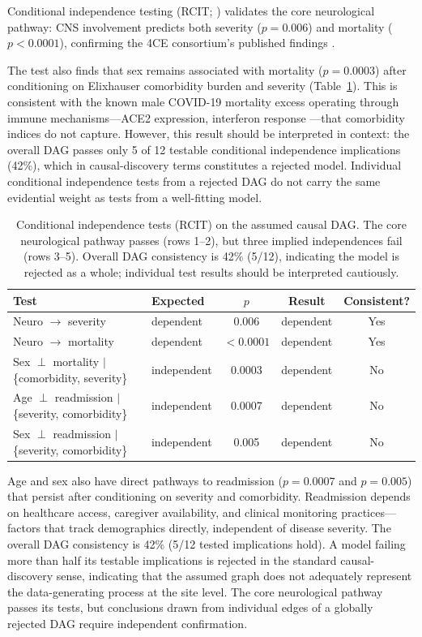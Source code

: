 \documentclass{article}
\begin{document}
Conditional independence testing (RCIT; \citealt{strobl2019rcit}) validates the core neurological pathway: CNS involvement predicts both severity ($p = 0.006$) and mortality ($p < 0.0001$), confirming the 4CE consortium's published findings \cite{four_ce_neuro2021}.

The test also finds that sex remains associated with mortality ($p = 0.0003$) after conditioning on Elixhauser comorbidity burden \cite{elixhauser1998} and severity (Table~\ref{tab:rcit}).
This is consistent with the known male COVID-19 mortality excess operating through immune mechanisms---ACE2 expression, interferon response \cite{takahashi2020sex, iadecola2020covid}---that comorbidity indices do not capture.
However, this result should be interpreted in context: the overall DAG passes only 5 of 12 testable conditional independence implications (42\%), which in causal-discovery terms constitutes a rejected model.
Individual conditional independence tests from a rejected DAG do not carry the same evidential weight as tests from a well-fitting model.

\begin{table}[t]
\centering
\caption{Conditional independence tests (RCIT) on the assumed causal DAG. The core neurological pathway passes (rows 1--2), but three implied independences fail (rows 3--5). Overall DAG consistency is 42\% (5/12), indicating the model is rejected as a whole; individual test results should be interpreted cautiously.}
\label{tab:rcit}
\begin{tabular}{llccc}
\toprule
Test & Expected & $p$ & Result & Consistent? \\
\midrule
Neuro $\to$ severity & dependent & 0.006 & dependent & Yes \\
Neuro $\to$ mortality & dependent & $< 0.0001$ & dependent & Yes \\
\midrule
Sex $\perp$ mortality $\mid$ \{comorbidity, severity\} & independent & 0.0003 & dependent & No \\
Age $\perp$ readmission $\mid$ \{severity, comorbidity\} & independent & 0.0007 & dependent & No \\
Sex $\perp$ readmission $\mid$ \{severity, comorbidity\} & independent & 0.005 & dependent & No \\
\bottomrule
\end{tabular}
\end{table}

Age and sex also have direct pathways to readmission ($p = 0.0007$ and $p = 0.005$) that persist after conditioning on severity and comorbidity.
Readmission depends on healthcare access, caregiver availability, and clinical monitoring practices---factors that track demographics directly, independent of disease severity.
The overall DAG consistency is 42\% (5/12 tested implications hold).
A model failing more than half its testable implications is rejected in the standard causal-discovery sense, indicating that the assumed graph does not adequately represent the data-generating process at the site level.
The core neurological pathway passes its tests, but conclusions drawn from individual edges of a globally rejected DAG require independent confirmation.
\end{document}
